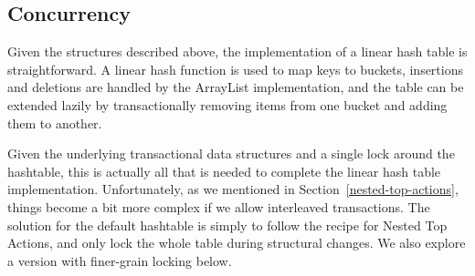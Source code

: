 \documentclass[10pt,letterpaper,twocolumn,english]{article}
\newcommand{\yad}{Lemon\xspace}
\begin{document}
\subsection{Concurrency}

Given the structures described above, the implementation of a linear
hash table is straightforward.  A linear hash function is used to map
keys to buckets, insertions and deletions are handled by the ArrayList
implementation, and the table can be extended lazily by
transactionally removing items from one bucket and adding them to
another.

Given the underlying transactional data structures and a
single lock around the hashtable, this is actually all that is needed
to complete the linear hash table implementation.  Unfortunately, as
we mentioned in Section~\ref{nested-top-actions}, things become a bit
more complex if we allow interleaved transactions.  The solution for
the default hashtable is simply to follow the recipe for Nested
Top Actions, and only lock the whole table during structural changes.
We also explore a version with finer-grain locking below.
\end{document}
